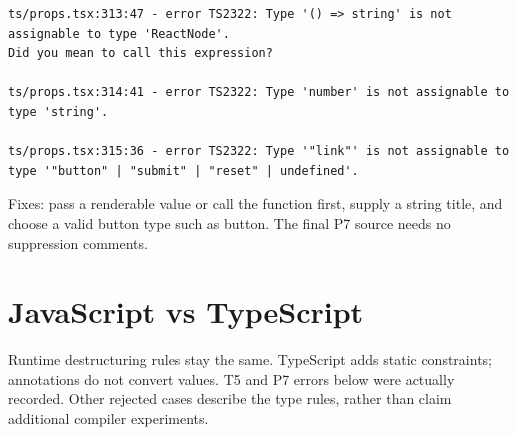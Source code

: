 \documentclass[10pt,a4paper]{article}
\begin{document}
\begin{lstlisting}[language={}]
ts/props.tsx:313:47 - error TS2322: Type '() => string' is not assignable to type 'ReactNode'.
Did you mean to call this expression?

ts/props.tsx:314:41 - error TS2322: Type 'number' is not assignable to type 'string'.

ts/props.tsx:315:36 - error TS2322: Type '"link"' is not assignable to type '"button" | "submit" | "reset" | undefined'.
\end{lstlisting}

Fixes: pass a renderable value or call the function first, supply a string title, and choose a valid button type such as button. The final P7 source needs no suppression comments.

\section{JavaScript vs TypeScript}

Runtime destructuring rules stay the same. TypeScript adds static constraints; annotations do not convert values. T5 and P7 errors below were actually recorded. Other rejected cases describe the type rules, rather than claim additional compiler experiments.
\end{document}
